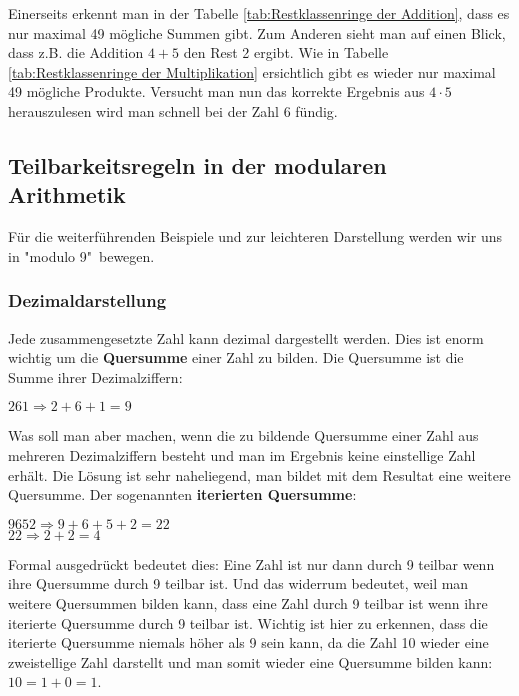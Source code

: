 \documentclass[german,12pt,a4paper]{article}
\begin{document}
Einerseits erkennt man in der Tabelle \ref{tab:Restklassenringe der Addition}, dass es nur maximal 49 mögliche Summen gibt.
Zum Anderen sieht man auf einen Blick, dass z.B. die Addition $4 + 5$ den Rest 2 ergibt.\newpage
Wie in Tabelle \ref{tab:Restklassenringe der Multiplikation} ersichtlich gibt es wieder nur maximal 49 mögliche Produkte.
Versucht man nun das korrekte Ergebnis aus $4 \cdot 5$ herauszulesen wird man schnell bei der Zahl 6 fündig.

\subsection{Teilbarkeitsregeln in der modularen Arithmetik}
Für die weiterführenden Beispiele und zur leichteren Darstellung werden wir uns in "modulo 9"\ bewegen.

\subsubsection{Dezimaldarstellung}
Jede zusammengesetzte Zahl kann dezimal dargestellt werden.
Dies ist enorm wichtig um die \textbf{Quersumme} einer Zahl zu bilden.
Die Quersumme ist die Summe ihrer Dezimalziffern:
\begin{center}
$261 \Rightarrow 2 + 6 +1 = 9$
\end{center}
Was soll man aber machen, wenn die zu bildende Quersumme einer Zahl aus mehreren Dezimalziffern besteht und man im Ergebnis keine einstellige Zahl erhält.
Die Lösung ist sehr naheliegend, man bildet mit dem Resultat eine weitere Quersumme.
Der sogenannten \textbf{iterierten Quersumme}:
\begin{center}
$9652 \Rightarrow 9 + 6 + 5 + 2 = 22$\\
$ 22 \Rightarrow 2 + 2 = 4$
\end{center}
Formal ausgedrückt bedeutet dies:\newline
Eine Zahl ist nur dann durch 9 teilbar wenn ihre Quersumme durch 9 teilbar ist.
Und das widerrum bedeutet, weil man weitere Quersummen bilden kann, dass eine Zahl durch 9 teilbar ist wenn ihre iterierte Quersumme durch 9 teilbar ist.
Wichtig ist hier zu erkennen, dass die iterierte Quersumme niemals höher als 9 sein kann, da die Zahl 10 wieder eine zweistellige Zahl darstellt und man somit wieder eine Quersumme bilden kann: $10 = 1 + 0 = 1$.
\end{document}

